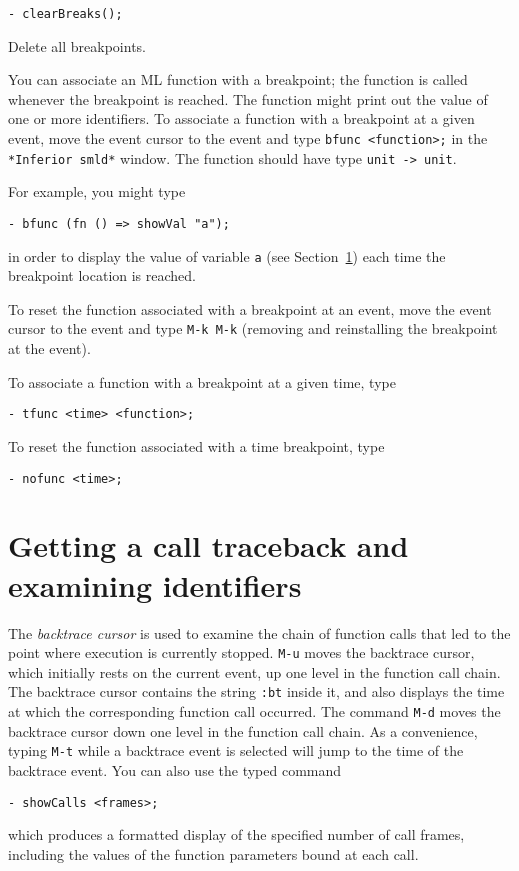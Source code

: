 \begin{verbatim}
- clearBreaks();
\end{verbatim}

Delete all breakpoints.

You can associate an ML function with a breakpoint; the function is
called whenever the breakpoint is reached.  The function might print
out the value of one or more identifiers.  To associate a function with
a breakpoint at a given event, move the event cursor to the event and
type \verb'bfunc <function>;' in the \verb'*Inferior smld*' window.  The
function should have type \verb'unit -> unit'.

For example, you might type

\begin{verbatim}
- bfunc (fn () => showVal "a");
\end{verbatim}

in order to display the value of variable \verb'a' (see 
Section~\ref{sec:queries}) each time the
breakpoint location is reached.

To reset the function associated with a breakpoint at an event, move
the event cursor to the event and type \verb'M-k M-k' (removing and
reinstalling the breakpoint at the event).

To associate a function with a breakpoint at a given time, type

\begin{verbatim}
- tfunc <time> <function>;
\end{verbatim}
To reset the function associated with a time breakpoint, type
\begin{verbatim}
- nofunc <time>;
\end{verbatim}

\section{Getting a call traceback and examining identifiers}
\label{sec:queries}

The {\em backtrace cursor} is used to examine the chain of function
calls that led to the point where execution is currently stopped.
\verb'M-u' moves the backtrace cursor, which initially rests on the current
event, up one level in the function call chain.  The
backtrace cursor contains the string \verb':bt' inside it, and also
displays the time at which the corresponding function call occurred.
The command \verb'M-d' moves the backtrace cursor down one level in
the function call chain.  As a convenience, typing \verb'M-t' while a
backtrace event is selected will jump to the time of the backtrace event.
You can also use the typed command
\begin{verbatim}
- showCalls <frames>;
\end{verbatim}
which produces a formatted display of the specified number of call frames,
including the values of the function parameters bound at each call.

